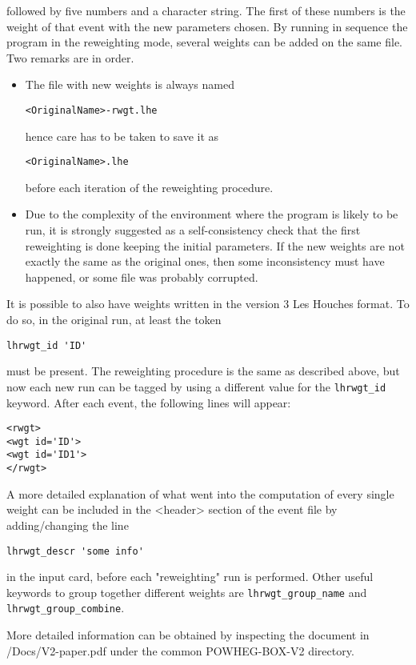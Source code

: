 followed by five numbers and a character string. The first of these 
numbers is the weight of that event with the new parameters chosen. By 
running in sequence the program in the reweighting mode, several 
weights can be added on the same file. Two remarks are in order.

\begin{itemize} 

\item The file with new weights is always named 
\begin{verbatim}
<OriginalName>-rwgt.lhe
\end{verbatim}
hence care has to be taken to save it as 
\begin{verbatim}
<OriginalName>.lhe
\end{verbatim}
before each iteration of the reweighting procedure. 

\item Due to the complexity of the environment where the program is 
likely to be run, it is strongly suggested as a self-consistency check 
that the first reweighting is done keeping the initial parameters. If 
the new weights are not exactly the same as the original ones, then 
some inconsistency must have happened, or some file was probably 
corrupted. 

\end{itemize} 

\noindent It is possible to also have weights written in the version 3 Les Houches format. 
To do so, in the original run, at least the token 

\begin{verbatim}
lhrwgt_id 'ID'
\end{verbatim}
must be present. The reweighting procedure is the same as described 
above, but now each new run can be tagged by using a different value 
for the \texttt{lhrwgt\_id} keyword. After each event, the following lines will 
appear: 

\begin{verbatim}
<rwgt> 
<wgt id='ID'>
<wgt id='ID1'>
</rwgt> 
\end{verbatim}

A more detailed explanation of what went into the computation of every 
single weight can be included in the <header> section of the event 
file by adding/changing the line 

\begin{verbatim}
lhrwgt_descr 'some info'
\end{verbatim}

in the input card, before each "reweighting" run is performed. Other 
useful keywords to group together different weights are 
\texttt{lhrwgt\_group\_name} and \texttt{lhrwgt\_group\_combine}. 

More detailed information can be obtained by inspecting the document in 
{\namecaps /Docs/V2-paper.pdf} under the common {\namecaps POWHEG-BOX-V2} directory. 

\section{\madgraph}


